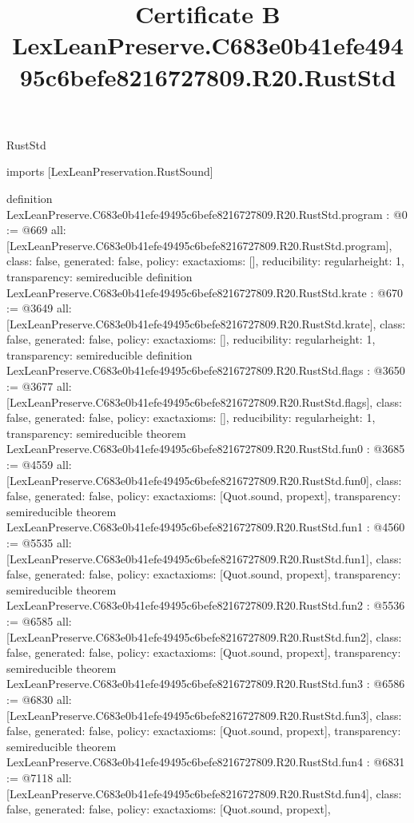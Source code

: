 \begin{lexlean}{RustStd}
\title{Certificate B LexLeanPreserve.C683e0b41efe49495c6befe8216727809.R20.RustStd}
\begin{coremodule}
imports [LexLeanPreservation.RustSound]

definition LexLeanPreserve.C683e0b41efe49495c6befe8216727809.R20.RustStd.program : @0 := @669 {
  all: [LexLeanPreserve.C683e0b41efe49495c6befe8216727809.R20.RustStd.program],
  class: false,
  generated: false,
  policy: exact{axioms: []},
  reducibility: regular{height: 1},
  transparency: semireducible
}
definition LexLeanPreserve.C683e0b41efe49495c6befe8216727809.R20.RustStd.krate : @670 := @3649 {
  all: [LexLeanPreserve.C683e0b41efe49495c6befe8216727809.R20.RustStd.krate],
  class: false,
  generated: false,
  policy: exact{axioms: []},
  reducibility: regular{height: 1},
  transparency: semireducible
}
definition LexLeanPreserve.C683e0b41efe49495c6befe8216727809.R20.RustStd.flags : @3650 := @3677 {
  all: [LexLeanPreserve.C683e0b41efe49495c6befe8216727809.R20.RustStd.flags],
  class: false,
  generated: false,
  policy: exact{axioms: []},
  reducibility: regular{height: 1},
  transparency: semireducible
}
theorem LexLeanPreserve.C683e0b41efe49495c6befe8216727809.R20.RustStd.fun0 : @3685 := @4559 {
  all: [LexLeanPreserve.C683e0b41efe49495c6befe8216727809.R20.RustStd.fun0],
  class: false,
  generated: false,
  policy: exact{axioms: [Quot.sound, propext]},
  transparency: semireducible
}
theorem LexLeanPreserve.C683e0b41efe49495c6befe8216727809.R20.RustStd.fun1 : @4560 := @5535 {
  all: [LexLeanPreserve.C683e0b41efe49495c6befe8216727809.R20.RustStd.fun1],
  class: false,
  generated: false,
  policy: exact{axioms: [Quot.sound, propext]},
  transparency: semireducible
}
theorem LexLeanPreserve.C683e0b41efe49495c6befe8216727809.R20.RustStd.fun2 : @5536 := @6585 {
  all: [LexLeanPreserve.C683e0b41efe49495c6befe8216727809.R20.RustStd.fun2],
  class: false,
  generated: false,
  policy: exact{axioms: [Quot.sound, propext]},
  transparency: semireducible
}
theorem LexLeanPreserve.C683e0b41efe49495c6befe8216727809.R20.RustStd.fun3 : @6586 := @6830 {
  all: [LexLeanPreserve.C683e0b41efe49495c6befe8216727809.R20.RustStd.fun3],
  class: false,
  generated: false,
  policy: exact{axioms: [Quot.sound, propext]},
  transparency: semireducible
}
theorem LexLeanPreserve.C683e0b41efe49495c6befe8216727809.R20.RustStd.fun4 : @6831 := @7118 {
  all: [LexLeanPreserve.C683e0b41efe49495c6befe8216727809.R20.RustStd.fun4],
  class: false,
  generated: false,
  policy: exact{axioms: [Quot.sound, propext]},
}
\end{coremodule}
\end{lexlean}
